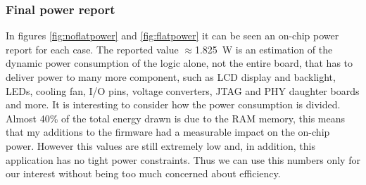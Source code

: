 \subsubsection{Final power report}
\noindent In figures \ref{fig:noflatpower} and \ref{fig:flatpower} it can be seen an on-chip power report for each case.
The reported value $\approx$1.825~W is an estimation of the dynamic power consumption of the logic alone, not the entire board, that has to deliver power to many more component, such as LCD display and backlight, LEDs, cooling fan, I/O pins, voltage converters, JTAG and PHY daughter boards and more.
It is interesting to consider how the power consumption is divided. Almost 40\% of the total energy drawn is due to the RAM memory, this means that my additions to the firmware had a measurable impact on the on-chip power. However this values are still extremely low and, in addition, this application has no tight power constraints.
Thus we can use this numbers only for our interest without being too much concerned about efficiency. 
